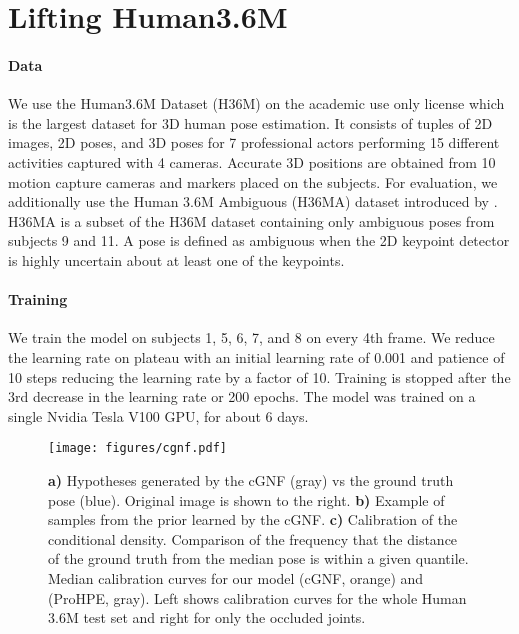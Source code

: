 \documentclass{article} \usepackage{iclr2023_conference,times}
\begin{document}
\section{Lifting Human3.6M}
\label{sec:lifting}

\paragraph{Data} We use the Human3.6M Dataset (H36M) on the academic use only license \citep{IonescuSminchisescu11, h36m_pami} which is the largest dataset for 3D human pose estimation.
It consists of tuples of 2D images, 2D poses, and 3D poses for 7 professional actors performing 15 different activities captured with 4 cameras.
Accurate 3D positions are obtained from 10 motion capture cameras and markers placed on the subjects.
For evaluation, we additionally use the Human 3.6M Ambiguous (H36MA) dataset introduced by \citet{Wehrbein_Rudolph_Rosenhahn_Wandt_2021}.
H36MA is a subset of the H36M dataset containing only ambiguous poses from subjects 9 and 11.
A pose is defined as ambiguous when the 2D keypoint detector is highly uncertain about at least one of the keypoints.


\paragraph{Training}
We train the model on subjects 1, 5, 6, 7, and 8 on every 4th frame.
We reduce the learning rate on plateau with an initial learning rate of 0.001 and patience of 10 steps reducing the learning rate by a factor of 10.
Training is stopped after the 3rd decrease in the learning rate or 200 epochs.
The model was trained on a single Nvidia Tesla V100 GPU, for about 6 days.

\begin{figure}[t!]
\centering
\texttt{[image: figures/cgnf.pdf]}
\caption{\textbf{a)} Hypotheses generated by the cGNF (gray) vs the ground truth pose (blue). Original image is shown to the right.
\textbf{b)} Example of samples from the prior learned by the cGNF.
\textbf{c)} Calibration of the conditional density. Comparison of the frequency that the distance of the ground truth from the median pose is within a given quantile. Median calibration curves for our model (cGNF, orange) and \citet{Wehrbein_Rudolph_Rosenhahn_Wandt_2021} (ProHPE, gray). Left shows calibration curves for the whole Human 3.6M test set and right for only the occluded joints.
}
\label{fig:fig3}
\end{figure}
\end{document}
